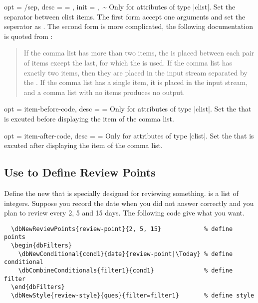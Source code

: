 \documentclass[full]{l3doc}
\begin{document}
\begin{documentation}
\begin{option}{
  opt = {/sep},
  desc = {= },
  init = {,~\~}
}
  Only for attributes of type |clist|. Set the separator between clist items.
  The first form accept one arguments and set the seperator as . The
  second form is more complicated, the following documentation is quoted from
  :
  \begin{quote}
    If the comma list has more than two items, the  is placed between each pair of items except the last, for
    which the  is used. If the comma list
    has exactly two items, then they are placed in the input stream separated
    by the . If the comma list has a single item,
    it is placed in the input stream, and a comma list with no items produces
    no output.
  \end{quote}

\end{option}

\begin{option}{
  opt = item-before-code,
  desc = {= }
}
  Only for attributes of type |clist|. Set the  that is
  excuted before displaying the item of the comma list.
\end{option}

\begin{option}{
  opt = item-after-code,
  desc = {= }
}
  Only for attributes of type |clist|. Set the  that is
  excuted after displaying the item of the comma list.
\end{option}

\subsection{Use  to Define Review Points}

\begin{function}{\dbNewReviewPoints}
  \begin{syntax}
      
  \end{syntax}

  Define the new  that is specially designed for reviewing
  something.  is a list of integers. Suppose you record the date
  when you did not answer correctly and you plan to review every 2, 5 and 15
  days. The following code give what you want.
\begin{verbatim}
  \dbNewReviewPoints{review-point}{2, 5, 15}            % define points
  \begin{dbFilters}
    \dbNewConditional{cond1}{date}{review-point|\Today} % define conditional
    \dbCombineConditionals{filter1}{cond1}              % define filter
  \end{dbFilters}
  \dbNewStyle{review-style}{ques}{filter=filter1}       % define style
\end{verbatim}
\end{function}


\end{documentation}
\end{document}
